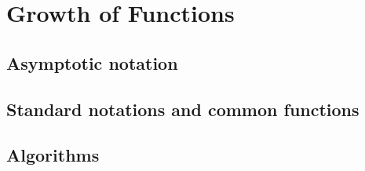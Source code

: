 \documentclass{report}
\begin{document}
\chapter{Growth of Functions}

\section{Asymptotic notation}

\section{Standard notations and common functions}

\section{Algorithms}
\end{document}
